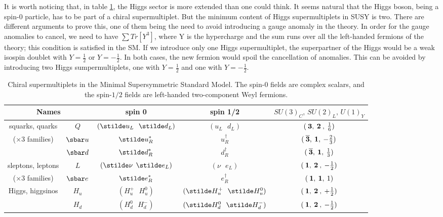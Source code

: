 It is worth noticing that, in table \ref{tab:chiral}, the Higgs sector is more extended than one could think. It seems natural that the Higgs boson, being a spin-0 particle, has to be part of a chiral supermultiplet. But the minimum content of Higgs supermultiplets in SUSY is two. There are different arguments to prove this, one of them being the need to avoid introducing a gauge anomaly in the theory. In order for the gauge anomalies to cancel, we need to have $\sum Tr \left[Y^3  \right]$, where Y is the hypercharge and the sum runs over all the left-handed fermions of the theory; this condition is satisfied in the SM. If we introduce only one Higgs supermultiplet, the superpartner of the Higgs would be a weak isospin doublet with $Y=\frac{1}{2}$ or $Y=-\frac{1}{2}$. In both cases, the new fermion would spoil the cancellation of anomalies. This can be avoided by introducing two Higgs sumpermultiplets, one with $Y=\frac{1}{2}$ and one with $Y=-\frac{1}{2}$.

\renewcommand{\arraystretch}{1.4}
\begin{table}[tb]
\begin{center}
\begin{tabular}{c c c c c}
\hline
\multicolumn{2}{c}{Names} 
& spin 0 & spin 1/2 & $SU(3)_C ,\, SU(2)_L ,\, U(1)_Y$
\\  \hline\hline
squarks, quarks & $Q$ & $({\stilde u}_L\>\>\>{\stilde d}_L )$&
 $(u_L\>\>\>d_L)$ & $(\>{\bf 3},\>{\bf 2}\>,\>{1\over 6})$
\\
($\times 3$ families) & $\sbar u$
&${\stilde u}^*_R$ & $u^\dagger_R$ & 
$(\>{\bf \overline 3},\> {\bf 1},\> -{2\over 3})$
\\ & $\sbar d$ &${\stilde d}^*_R$ & $d^\dagger_R$ & 
$(\>{\bf \overline 3},\> {\bf 1},\> {1\over 3})$
\\  \hline
sleptons, leptons & $L$ &$({\stilde \nu}\>\>{\stilde e}_L )$&
 $(\nu\>\>\>e_L)$ & $(\>{\bf 1},\>{\bf 2}\>,\>-{1\over 2})$
\\
($\times 3$ families) & $\sbar e$
&${\stilde e}^*_R$ & $e^\dagger_R$ & $(\>{\bf 1},\> {\bf 1},\>1)$
\\  \hline
Higgs, higgsinos &$H_u$ &$(H_u^+\>\>\>H_u^0 )$&
$(\stilde H_u^+ \>\>\> \stilde H_u^0)$& 
$(\>{\bf 1},\>{\bf 2}\>,\>+{1\over 2})$
\\ &$H_d$ & $(H_d^0 \>\>\> H_d^-)$ & $(\stilde H_d^0 \>\>\> \stilde H_d^-)$& 
$(\>{\bf 1},\>{\bf 2}\>,\>-{1\over 2})$
\\  \hline
\end{tabular}
\caption{Chiral supermultiplets in the Minimal Supersymmetric Standard Model.
The spin-$0$ fields are complex scalars, and the spin-$1/2$ fields are 
left-handed two-component Weyl fermions.\label{tab:chiral}}
\vspace{-0.6cm}
\end{center}
\end{table}


